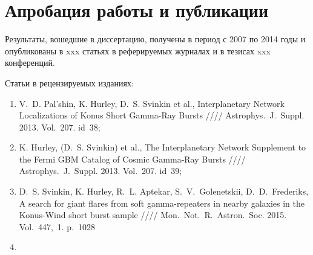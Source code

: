\section{Апробация работы и публикации}
Результаты, вошедшие в диссертацию, получены в период с 2007 по 2014
годы и опубликованы в xxx статьях в реферируемых журналах и в тезисах xxx конференций. 

Статьи в рецензируемых изданиях:
\begin{enumerate}
\item V.~D. Pal'shin, K. Hurley, D.~S. Svinkin et al., Interplanetary Network Localizations of
Konus Short Gamma-Ray Bursts //// Astrophys.~J.~Suppl. 2013. Vol.~207. id~38;
\item K. Hurley, (D.~S. Svinkin) et al., The Interplanetary Network Supplement to 
the Fermi GBM Catalog of Cosmic Gamma-Ray Bursts //// Astrophys.~J.~Suppl. 2013. Vol.~207. id~39;
\item D.~S. Svinkin, K. Hurley, R.~L. Aptekar, S.~V.~Golenetskii, D.~D.~Frederiks, 
A search for giant flares from soft gamma-repeaters in nearby galaxies in the 
Konus-Wind short burst sample //// Mon.~Not.~R.~Astron.~Soc. 2015. Vol.~447,~1. p.~1028
\item 
\end{enumerate}


